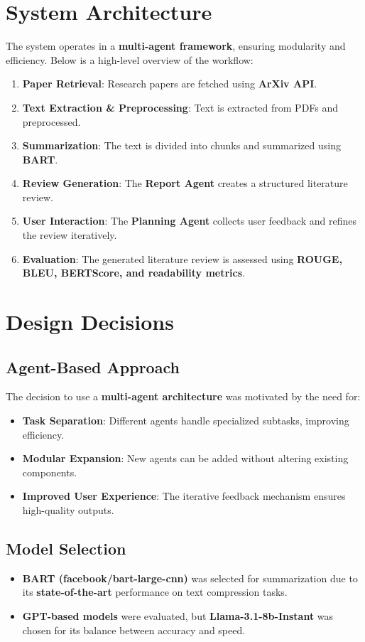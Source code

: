 \section{System Architecture}
The system operates in a \textbf{multi-agent framework}, ensuring modularity and efficiency. Below is a high-level overview of the workflow:
\begin{enumerate}
\item \textbf{Paper Retrieval}: Research papers are fetched using \textbf{ArXiv API}.
\item \textbf{Text Extraction & Preprocessing}: Text is extracted from PDFs and preprocessed.
\item \textbf{Summarization}: The text is divided into chunks and summarized using \textbf{BART}.
\item \textbf{Review Generation}: The \textbf{Report Agent} creates a structured literature review.
\item \textbf{User Interaction}: The \textbf{Planning Agent} collects user feedback and refines the review iteratively.
\item \textbf{Evaluation}: The generated literature review is assessed using \textbf{ROUGE, BLEU, BERTScore, and readability metrics}.
\end{enumerate}

\section{Design Decisions}
\subsection{Agent-Based Approach}
The decision to use a \textbf{multi-agent architecture} was motivated by the need for:
\begin{itemize}
\item \textbf{Task Separation}: Different agents handle specialized subtasks, improving efficiency.
\item \textbf{Modular Expansion}: New agents can be added without altering existing components.
\item \textbf{Improved User Experience}: The iterative feedback mechanism ensures high-quality outputs.
\end{itemize}

\subsection{Model Selection}
\begin{itemize}
\item \textbf{BART (facebook/bart-large-cnn)} was selected for summarization due to its \textbf{state-of-the-art} performance on text compression tasks.
\item \textbf{GPT-based models} were evaluated, but \textbf{Llama-3.1-8b-Instant} was chosen for its balance between accuracy and speed.
\end{itemize}

